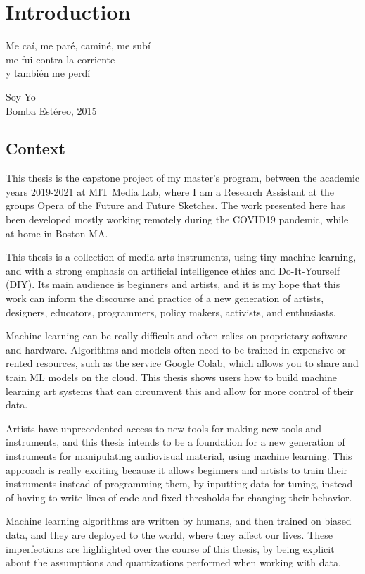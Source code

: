 \chapter{Introduction}

\epigraph{Me caí, me paré, caminé, me subí \\ me fui contra la corriente \\ y también me perdí}{Soy Yo \\ Bomba Estéreo, 2015}

\section{Context}

This thesis is the capstone project of my master's program, between the academic years 2019-2021 at MIT Media Lab, where I am a Research Assistant at the groups Opera of the Future and Future Sketches. The work presented here has been developed mostly working remotely during the COVID19 pandemic, while at home in Boston MA.

This thesis is a collection of media arts instruments, using tiny machine learning, and with a strong emphasis on artificial intelligence ethics and Do-It-Yourself (DIY). Its main audience is beginners and artists, and it is my hope that this work can inform the discourse and practice of a new generation of artists,  designers, educators, programmers, policy makers, activists, and enthusiasts.

Machine learning can be really difficult and often relies on proprietary software and hardware. Algorithms and models often need to be trained in expensive or rented resources, such as the service Google Colab, which allows you to share and train ML models on the cloud. This thesis shows users how to build machine learning art systems that can circumvent this and allow for more control of their data.

Artists have unprecedented access to new tools for making new tools and instruments, and this thesis intends to be a foundation for a new generation of instruments for manipulating audiovisual material, using machine learning. This approach is really exciting because it allows beginners and artists to train their instruments instead of programming them, by inputting data for tuning, instead of having to write lines of code and fixed thresholds for changing their behavior.

Machine learning algorithms are written by humans, and then trained on biased data, and they are deployed to the world, where they affect our lives. These imperfections are highlighted over the course of this thesis, by being explicit about the assumptions and quantizations performed when working with data.


